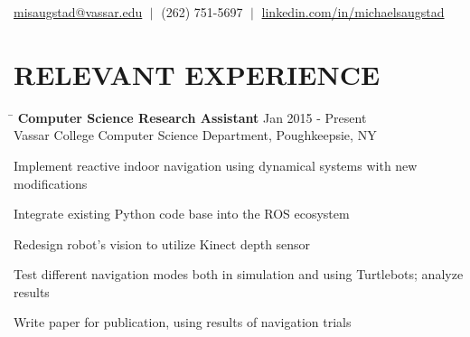 \documentclass{res}
\newcommand{\vb}{\; | \;}
\begin{document}
 
                                  
\begin{resume}
\vspace{-5pt}
{\large %
  \begin{center}
    \href{mailto:misaugstad@vassar.edu}{misaugstad@vassar.edu} $\vb$
    (262) 751-5697 $\vb$
    \href{https://www.linkedin.com/in/michaelsaugstad/}
         {linkedin.com/in/michaelsaugstad}
  \end{center}

  \vspace{-3pt}
  \section{\hspace{0.3in}RELEVANT EXPERIENCE}
    \vspace{-3pt}
    \begin{tabbing}
      \hspace{5.65in}\=  \kill %
      {\bf Computer Science Research Assistant}
      \>Jan 2015 - Present\\
      Vassar College Computer Science Department, Poughkeepsie, NY\\     
    \end{tabbing}
    \vspace{-24pt}      %
    \begin{list}{\bf{-}}{}
      \setlength{\itemsep}{-2pt}
      \item Implement reactive indoor navigation using dynamical systems with
            new modifications
      \item Integrate existing Python code base into the ROS ecosystem
      \item Redesign robot's vision to utilize Kinect depth sensor
      \item Test different navigation modes both in simulation and using
            Turtlebots; analyze results
      \item Write paper for publication, using results of navigation trials
    \end{list}

}
\end{resume}
\end{document}
